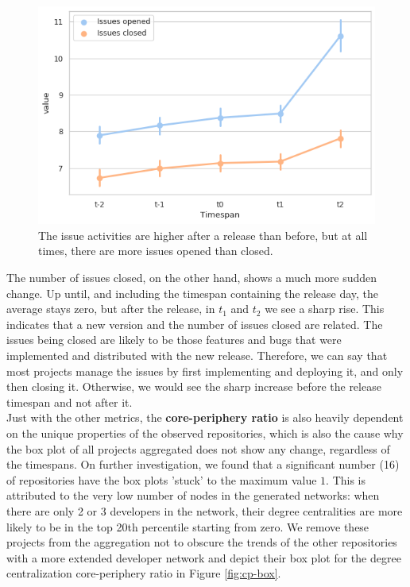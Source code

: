 \begin{figure}[!htbp]
    \centering
    \includegraphics[width=\textwidth]{figures/quantitative/pointplots/issues.png}
    \caption{The issue activities are higher after a release than before, but at all times, there are more issues opened than closed.}
    \label{fig:issues-box}
\end{figure}

The number of issues closed, on the other hand, shows a much more sudden change. Up until, and including the timespan containing the release day, the average stays zero, but after the release, in $t_1$ and $t_2$ we see a sharp rise. This indicates that a new version and the number of issues closed are related. The issues being closed are likely to be those features and bugs that were implemented and distributed with the new release. Therefore, we can say that most projects manage the issues by first implementing and deploying it, and only then closing it. Otherwise, we would see the sharp increase before the release timespan and not after it. \\

Just with the other metrics, the \textbf{core-periphery ratio} is also heavily dependent on the unique properties of the observed repositories, which is also the cause why the box plot of all projects aggregated does not show any change, regardless of the timespans. On further investigation, we found that a significant number (16) of repositories have the box plots 'stuck' to the maximum value $1$. This is attributed to the very low number of nodes in the generated networks: when there are only 2 or 3 developers in the network, their degree centralities are more likely to be in the top 20th percentile starting from zero. We remove these projects from the aggregation not to obscure the trends of the other repositories with a more extended developer network and depict their box plot for the degree centralization core-periphery ratio in Figure \ref{fig:cp-box}.

